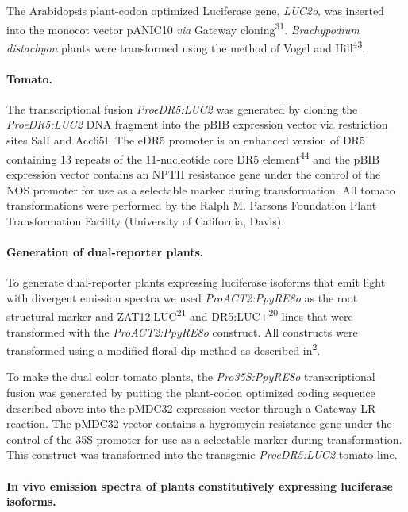 \documentclass[]{article}
\begin{document}
The Arabidopsis plant-codon optimized Luciferase gene, \emph{LUC2o}, was
inserted into the monocot vector pANIC10 \emph{via} Gateway
cloning\textsuperscript{31}. \emph{Brachypodium distachyon} plants were
transformed using the method of Vogel and Hill\textsuperscript{43}.

\paragraph{Tomato.}\label{tomato.}

The transcriptional fusion \emph{ProeDR5:LUC2} was generated by cloning
the \emph{ProeDR5:LUC2} DNA fragment into the pBIB expression vector via
restriction sites SalI and Acc65I. The eDR5 promoter is an enhanced
version of DR5 containing 13 repeats of the 11-nucleotide core DR5
element\textsuperscript{44} and the pBIB expression vector contains an
NPTII resistance gene under the control of the NOS promoter for use as a
selectable marker during transformation. All tomato transformations were
performed by the Ralph M. Parsons Foundation Plant Transformation
Facility (University of California, Davis).

\paragraph{Generation of dual-reporter
plants.}\label{generation-of-dual-reporter-plants.}

To generate dual-reporter plants expressing luciferase isoforms that
emit light with divergent emission spectra we used
\emph{ProACT2:PpyRE8o} as the root structural marker and
ZAT12:LUC\textsuperscript{21} and DR5:LUC+\textsuperscript{20} lines
that were transformed with the \emph{ProACT2:PpyRE8o} construct. All
constructs were transformed using a modified floral dip method as
described in\textsuperscript{2}.

To make the dual color tomato plants, the \emph{Pro35S:PpyRE8o}
transcriptional fusion was generated by putting the plant-codon
optimized coding sequence described above into the pMDC32 expression
vector through a Gateway LR reaction. The pMDC32 vector contains a
hygromycin resistance gene under the control of the 35S promoter for use
as a selectable marker during transformation. This construct was
transformed into the transgenic \emph{ProeDR5:LUC2} tomato line.

\paragraph{In vivo emission spectra of plants constitutively expressing
luciferase
isoforms.}\label{in-vivo-emission-spectra-of-plants-constitutively-expressing-luciferase-isoforms.}
\end{document}
